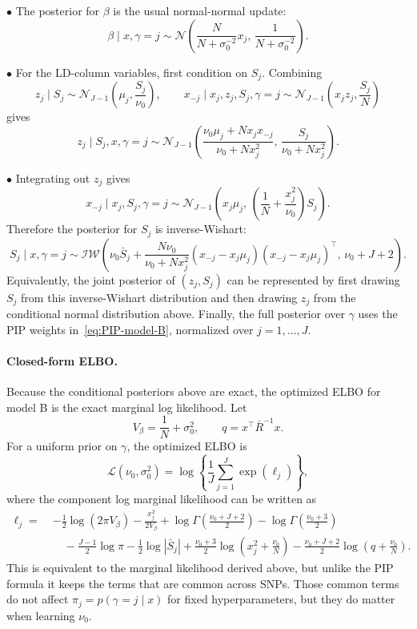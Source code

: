 \documentclass[11pt]{article}
\newcommand{\Normal}{\mathcal N}
\begin{document}
$\bullet$ The posterior for $\beta$ is the usual normal-normal update:
\[
\boxed{
\beta\mid x,\gamma=j
\sim
\Normal\left(
\frac{N}{N+\sigma_0^{-2}}x_j,\,
\frac{1}{N+\sigma_0^{-2}}
\right).
}
\]

$\bullet$ For the LD-column variables, first condition on $S_j$. Combining
\[
z_j\mid S_j\sim \Normal_{J-1}\left(\mu_j,\frac{S_j}{\nu_0}\right),
\qquad
x_{-j}\mid x_j,z_j,S_j,\gamma=j
\sim
\Normal_{J-1}\left(x_jz_j,\frac{S_j}{N}\right)
\]
gives
\[
\boxed{
z_j\mid S_j,x,\gamma=j
\sim
\Normal_{J-1}\left(
\frac{\nu_0\mu_j+Nx_jx_{-j}}{\nu_0+Nx_j^2},\,
\frac{S_j}{\nu_0+Nx_j^2}
\right).
}
\]

$\bullet$ Integrating out $z_j$ gives
\[
x_{-j}\mid x_j,S_j,\gamma=j
\sim
\Normal_{J-1}\left(
x_j\mu_j,\,
\left(\frac{1}{N}+\frac{x_j^2}{\nu_0}\right)S_j
\right).
\]
Therefore the posterior for $S_j$ is inverse-Wishart:
\[
\boxed{
S_j\mid x,\gamma=j
\sim
\mathcal{IW}\left(
\nu_0\bar S_j+
\frac{N\nu_0}{\nu_0+Nx_j^2}
(x_{-j}-x_j\mu_j)(x_{-j}-x_j\mu_j)^\top,\,
\nu_0+J+2
\right).
}
\]
Equivalently, the joint posterior of $(z_j,S_j)$ can be represented by first
drawing $S_j$ from this inverse-Wishart distribution and then drawing $z_j$
from the conditional normal distribution above. Finally, the full posterior
over $\gamma$ uses the PIP weights in~\eqref{eq:PIP-model-B}, normalized over
$j=1,\ldots,J$.

\paragraph{Closed-form ELBO.}
Because the conditional posteriors above are exact, the optimized ELBO for
model B is the exact marginal log likelihood. Let
\[
V_\beta=\frac{1}{N}+\sigma_0^2,
\qquad
q=x^\top\bar R^{-1}x.
\]
For a uniform prior on $\gamma$, the optimized ELBO is
\[
\mathcal L(\nu_0,\sigma_0^2)
=
\log\left\{
\frac{1}{J}\sum_{j=1}^J \exp(\ell_j)
\right\},
\]
where the component log marginal likelihood can be written as
\begin{align*}
\ell_j
=\;&
-\frac{1}{2}\log(2\pi V_\beta)
-\frac{x_j^2}{2V_\beta}
+\log\Gamma\left(\frac{\nu_0+J+2}{2}\right)
-\log\Gamma\left(\frac{\nu_0+3}{2}\right) \\
&\quad
-\frac{J-1}{2}\log\pi
-\frac{1}{2}\log|\bar S_j|
+\frac{\nu_0+3}{2}\log\left(x_j^2+\frac{\nu_0}{N}\right)
-\frac{\nu_0+J+2}{2}\log\left(q+\frac{\nu_0}{N}\right).
\end{align*}
This is equivalent to the marginal likelihood derived above, but unlike the
PIP formula it keeps the terms that are common across SNPs. Those common terms
do not affect $\pi_j=p(\gamma=j\mid x)$ for fixed hyperparameters, but they do
matter when learning $\nu_0$.
\end{document}
